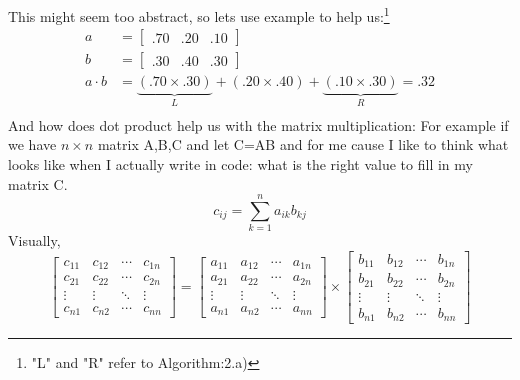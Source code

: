 \documentclass{article}
\begin{document}
\begin{enumerate}[(a)]
This might seem too abstract, so lets use example to help us:\footnote{"L" and "R" refer to Algorithm:2.a)} 
\begin{equation*}
\begin{split}
a&=\left[\begin{array}{lll}{.70} & {.20} & {.10}\end{array}\right]\\
b&=\left[\begin{array}{lll}{.30} & {.40} & {.30}\end{array}\right]\\
a\cdot b&=\underbrace{(.70 \times .30)}_{L}+(.20 \times .40)+\underbrace{(.10 \times .30)}_{R}=.32\\
\end{split}
\end {equation*}
And how does dot product help us with the matrix multiplication:
For example if we have $n\times n$ matrix A,B,C and let C=AB and for me cause I like to think what looks like when I actually write in code: what is the right value to fill in my matrix C. 
\begin{equation}
c_{i j}=\sum_{k=1}^{n} a_{i k} b_{k j}
\end{equation}
Visually,
\begin{equation*}\left[ \begin{array}{cccc}{c_{11}} & {c_{12}} & {\cdots} & {c_{1 n}} \\ {c_{21}} & {c_{22}} & {\cdots} & {c_{2 n}} \\ {\vdots} & {\vdots} & {\ddots} & {\vdots} \\ {c_{n 1}} & {c_{n 2}} & {\cdots} & {c_{n n}}\end{array}\right]=\left[ \begin{array}{cccc}{a_{11}} & {a_{12}} & {\cdots} & {a_{1 n}} \\ {a_{21}} & {a_{22}} & {\cdots} & {a_{2 n}} \\ {\vdots} & {\vdots} & {\ddots} & {\vdots} \\ {a_{n 1}} & {a_{n 2}} & {\cdots} & {a_{n n}}\end{array}\right] \times \left[ \begin{array}{cccc}{b_{11}} & {b_{12}} & {\cdots} & {b_{1 n}} \\ {b_{21}} & {b_{22}} & {\cdots} & {b_{2 n}} \\ {\vdots} & {\vdots} & {\ddots} & {\vdots} \\ {b_{n 1}} & {b_{n 2}} & {\cdots} & {b_{n n}}\end{array}\right]\end{equation*}

\end{enumerate}
\end{document}
